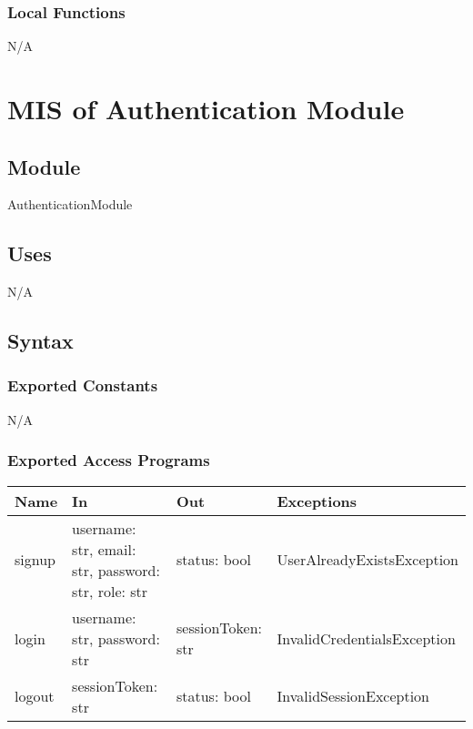 \documentclass[12pt, titlepage]{article}
\begin{document}
\subsubsection{Local Functions}
N/A
\section{MIS of Authentication Module} \label{AuthenticationModule}


\subsection{Module}

AuthenticationModule

\subsection{Uses}

N/A

\subsection{Syntax}

\subsubsection{Exported Constants}

N/A

\subsubsection{Exported Access Programs}

\begin{center}
\begin{tabular}{p{3cm} p{4cm} p{4cm} p{5cm}}
\hline
\textbf{Name} & \textbf{In} & \textbf{Out} & \textbf{Exceptions} \\
\hline
signup & \raggedright\arraybackslash username: str, email: str, password: str, role: str & \raggedright\arraybackslash status: bool & \raggedright\arraybackslash UserAlreadyExistsException \\
\hline
login & \raggedright\arraybackslash username: str, password: str & \raggedright\arraybackslash sessionToken: str & \raggedright\arraybackslash InvalidCredentialsException \\
\hline
logout & \raggedright\arraybackslash sessionToken: str & \raggedright\arraybackslash status: bool & \raggedright\arraybackslash InvalidSessionException \\
\hline
\end{tabular}
\end{center}
\end{document}
